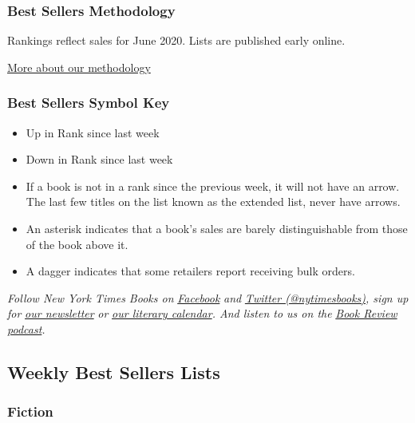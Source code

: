 \hypertarget{best-sellers-methodology}{%
\subsubsection{Best Sellers
Methodology}\label{best-sellers-methodology}}

Rankings reflect sales for June 2020. Lists are published early online.

\href{/books/best-sellers/methodology/}{More about our methodology}

\hypertarget{best-sellers-symbol-key}{%
\subsubsection{Best Sellers Symbol Key}\label{best-sellers-symbol-key}}

\begin{itemize}
\item
  Up in Rank since last week
\item
  Down in Rank since last week
\item
  If a book is not in a rank since the previous week, it will not have
  an arrow. The last few titles on the list known as the extended list,
  never have arrows.
\item
  An asterisk indicates that a book's sales are barely distinguishable
  from those of the book above it.
\item
  A dagger indicates that some retailers report receiving bulk orders.
\end{itemize}

\emph{Follow New York Times Books on}
\href{https://www.facebookcorewwwi.onion/nytbooks/}{\emph{Facebook}}
\emph{and} \href{https://twitter.com/nytimesbooks}{\emph{Twitter
(@nytimesbooks)}}\emph{, sign up for}
\href{https://www.nytimes3xbfgragh.onion/newsletters/books-review}{\emph{our
newsletter}} \emph{or}
\href{https://www.nytimes3xbfgragh.onion/interactive/2017/books/books-calendar.html}{\emph{our
literary calendar}}\emph{. And listen to us on the}
\href{https://www.nytimes3xbfgragh.onion/column/book-review-podcast}{\emph{Book
Review podcast}}\emph{.}

\hypertarget{weekly-best-sellers-lists}{%
\subsection{Weekly Best Sellers Lists}\label{weekly-best-sellers-lists}}

\hypertarget{fiction}{%
\subsubsection{Fiction}\label{fiction}}

